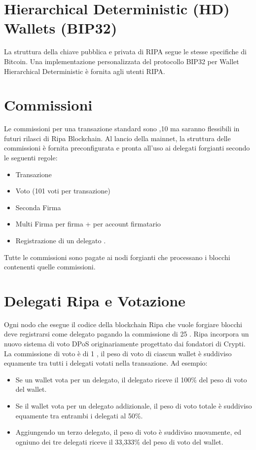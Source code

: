 \documentclass[11pt,fleqn,oneside]{book} %
\begin{document}
\section{Hierarchical Deterministic (HD) Wallets (BIP32)}
La struttura della chiave pubblica e privata di RIPA segue le stesse specifiche di Bitcoin. Una implementazione
personalizzata del protocollo BIP32 per Wallet Hierarchical Deterministic è fornita agli utenti RIPA.

\section{Commissioni}
Le commissioni per una transazione standard sono ,10 ma saranno flessibili in futuri rilasci di Ripa Blockchain.
Al lancio della mainnet, la struttura delle commissioni è fornita preconfigurata e pronta all'uso ai delegati
forgianti secondo le seguenti regole:
	\begin{itemize}
		\item Transazione 
		\item Voto  (101 voti per transazione)
		\item Seconda Firma 
		\item Multi Firma  per firma +  per account firmatario
		\item Registrazione di un delegato .
	\end{itemize}
Tutte le commissioni sono pagate ai nodi forgianti che processano i blocchi contenenti quelle commissioni.

\section{Delegati Ripa e Votazione}
Ogni nodo che esegue il codice della blockchain Ripa che vuole forgiare blocchi deve registrarsi come 
delegato pagando la commissione di 25 \PHP. Ripa incorpora un nuovo sistema di voto DPoS
originariamente progettato dai fondatori di Crypti. La commissione di voto è di 1 \PHP, 
il peso di voto di ciascun wallet è suddiviso equamente tra tutti i delegati votati 
nella transazione. Ad esempio: 
\begin{itemize}
	\item Se un wallet vota per un delegato, il delegato riceve il 100\% del peso di voto del
	wallet.
	\item Se il wallet vota per un delegato addizionale, il peso di voto totale è 
	suddiviso equamente tra entrambi i delegati al 50\%.
	\item Aggiungendo un terzo delegato, il peso di voto è suddiviso nuovamente, 
	ed ogniuno dei tre delegati riceve il 33,333\% del peso di voto del wallet.
\end{itemize}
\end{document}
